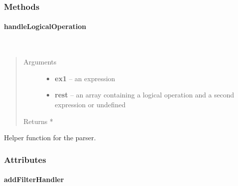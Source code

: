 \documentclass[letterpaper,10pt,english]{sphinxmanual}
\begin{document}
\begin{fulllineitems}
\label{ambrosia_web.filter:ambrosia_web.filter}
\end{fulllineitems}



\subsubsection{Methods}
\label{ambrosia_web.filter:methods}

\paragraph{handleLogicalOperation}
\label{ambrosia_web.filter:handlelogicaloperation}

\begin{fulllineitems}
\label{ambrosia_web.filter:ambrosia_web.filter.handleLogicalOperation}~\begin{quote}\begin{description}
\item[{Arguments}] \leavevmode\begin{itemize}
\item {} 
\textbf{ex1} -- an expression

\item {} 
\textbf{rest} -- an array containing a logical operation and a second expression or undefined

\end{itemize}

\item[{Returns *}] \leavevmode
\end{description}\end{quote}

\end{fulllineitems}


Helper function for the parser.


\subsubsection{Attributes}
\label{ambrosia_web.filter:attributes}

\paragraph{addFilterHandler}
\label{ambrosia_web.filter:addfilterhandler}
\end{document}

